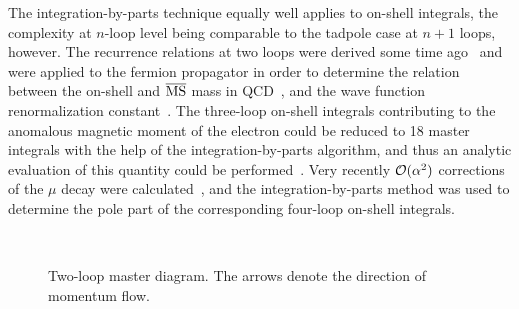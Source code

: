 The integration-by-parts technique equally well applies to on-shell 
integrals, the
complexity at $n$-loop level being comparable to the tadpole case at
$n+1$ loops, however.  The recurrence relations at two loops were
derived some time ago~\cite{GraBroGraSch90} and were applied to the
fermion propagator in order to determine the relation between the
on-shell and $\overline{\rm MS}$ mass in QCD~\cite{GraBroGraSch90}, and
the wave function renormalization constant~\cite{BroGraSch91}.  The
three-loop on-shell integrals contributing to the anomalous magnetic
moment of the electron could be reduced to 18 master
integrals with the help of the integration-by-parts algorithm, and
thus an 
analytic
evaluation of this quantity could be performed~\cite{LapRem96}.  Very
recently ${\cal O}(\alpha^2)$ corrections of the $\mu$ decay were
calculated~\cite{RitStu98}, and the integration-by-parts method was
used to 
determine the
pole part of the corresponding four-loop on-shell integrals.
%
\begin{figure}[h]
  \begin{center}
  \leavevmode
      \epsfxsize=2.5cm
      \\
    \parbox{\captionwidth}{
      \caption[]{\label{figtriangle}\sloppy
        Two-loop master diagram. The arrows denote the direction of
        momentum flow.
        }      }
  \end{center}
\end{figure}
%

